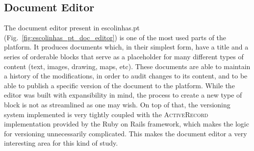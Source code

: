 \subsection{Document Editor}\label{sec:case-study_areas_document_editor}
The document editor present in escolinhas.pt (Fig.~\ref{fig:escolinhas_pt_doc_editor}) is one of the most used parts of the platform. It produces documents which, in their simplest form, have a title and a series of orderable blocks that serve as a placeholder for many different types of content (text, images, drawing, maps, etc). These documents are able to maintain a history of the modifications, in order to audit changes to its content, and to be able to publish a specific version of the document to the platform. While the editor was built with expansibility in mind, the process to create a new type of block is not as streamlined as one may wish. On top of that, the versioning system implemented is very tightly coupled with the \textsc{ActiveRecord} implementation provided by the Ruby on Rails framework, which makes the logic for versioning unnecessarily complicated. This makes the document editor a very interesting area for this kind of study.

